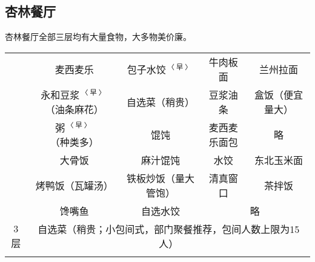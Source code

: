 \subsection[杏林餐厅]{杏林餐厅}
杏林餐厅全部三层均有大量食物，大多物美价廉。

\newpage
\begin{table}[ht]
    \centering
    \begin{tabular}{c|c|c|c|c|}
        \Xhline{1.2pt}
        \multirow{3}{*}{1层} & 麦西麦乐                         & 包子水饺$^{〈早〉}$ & 牛肉板面    & 兰州拉面         \\
        \cline{2-5}
                            & 永和豆浆$^{〈早〉}$（油条麻花）   & 自选菜（稍贵）      & 豆浆油条    & 盒饭（便宜量大） \\
        \cline{2-5}
                            & 粥$^{〈早〉}$（种类多）           & 馄饨                & 麦西麦乐面包 & 略              \\
        \Xhline{1.2pt} 
        \multirow{3}{*}{2层} & 大骨饭                           & 麻汁馄饨            & 水饺         & 东北玉米面       \\
        \cline{2-5}
                            & 烤鸭饭（瓦罐汤）                  & 铁板炒饭（量大管饱）& 清真窗口     & 茶拌饭           \\
        \cline{2-5}
                            & 馋嘴鱼                            & 自选水饺            & \multicolumn{2}{c|}{略}         \\
        \Xhline{1.2pt}
        3层\footnotemark  & \multicolumn{4}{c|}{自选菜（稍贵；小包间式，部门聚餐推荐，包间人数上限为15人）}\\
        \Xhline{1.2pt}
    \end{tabular}
\end{table}

